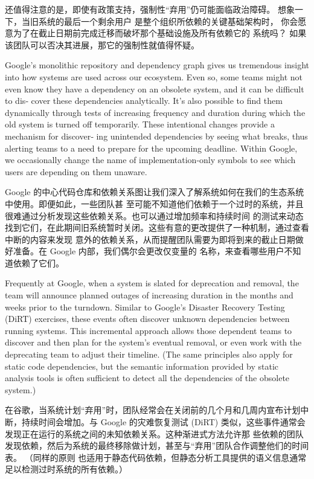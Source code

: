 \documentclass[10pt,a4paper,UTF8]{ctexart}
\begin{document}
还值得注意的是，即使有政策支持，强制性“弃用”仍可能面临政治障碍。 想象一下，当旧系统的最后一个剩余用户
是整个组织所依赖的关键基础架构时， 你会愿意为了在截止日期前完成迁移而破坏那个基础设施及所有依赖它的
系统吗？ 如果该团队可以否决其进展，那它的强制性就值得怀疑。

Google’s monolithic repository and dependency graph gives us tremendous insight into how systems are
used across our ecosystem. Even so, some teams might not even know they have a dependency on an
obsolete system, and it can be difficult to dis‐ cover these dependencies analytically. It’s also
possible to find them dynamically through tests of increasing frequency and duration during which
the old system is turned off temporarily. These intentional changes provide a mechanism for
discover‐ ing unintended dependencies by seeing what breaks, thus alerting teams to a need to
prepare for the upcoming deadline. Within Google, we occasionally change the name of
implementation-only symbols to see which users are depending on them unaware.

Google 的中心代码仓库和依赖关系图让我们深入了解系统如何在我们的生态系统中使用。即便如此，一些团队甚
至可能不知道他们依赖于一个过时的系统，并且很难通过分析发现这些依赖关系。也可以通过增加频率和持续时间
的测试来动态找到它们，在此期间旧系统暂时关闭。这些有意的更改提供了一种机制，通过查看中断的内容来发现
意外的依赖关系，从而提醒团队需要为即将到来的截止日期做好准备。在 Google 内部，我们偶尔会更改仅变量的
名称，来查看哪些用户不知道依赖了它们。

Frequently at Google, when a system is slated for deprecation and removal, the team will announce
planned outages of increasing duration in the months and weeks prior to the turndown. Similar to
Google’s Disaster Recovery Testing (DiRT) exercises, these events often discover unknown
dependencies between running systems. This incremental approach allows those dependent teams to
discover and then plan for the system’s eventual removal, or even work with the deprecating team to
adjust their timeline. (The same principles also apply for static code dependencies, but the
semantic information provided by static analysis tools is often sufficient to detect all the
dependencies of the obsolete system.)

在谷歌，当系统计划“弃用”时，团队经常会在关闭前的几个月和几周内宣布计划中断，持续时间会增加。与 Google
的灾难恢复测试 (DiRT) 类似，这些事件通常会发现正在运行的系统之间的未知依赖关系。这种渐进式方法允许那
些依赖的团队发现依赖，然后为系统的最终移除做计划，甚至与“弃用”团队合作调整他们的时间表。 （同样的原则
也适用于静态代码依赖，但静态分析工具提供的语义信息通常足以检测过时系统的所有依赖。）
\end{document}
